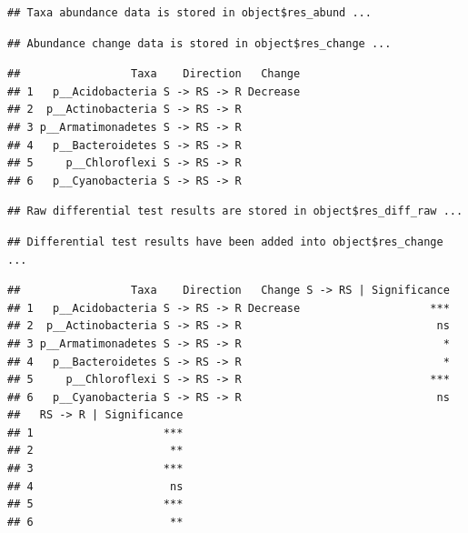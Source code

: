 \documentclass[
]{book}
\newenvironment{Shaded}{\begin{snugshade}}{\end{snugshade}}
\newcommand{\AttributeTok}[1]{\textcolor[rgb]{0.77,0.63,0.00}{#1}}
\newcommand{\CommentTok}[1]{\textcolor[rgb]{0.56,0.35,0.01}{\textit{#1}}}
\newcommand{\ConstantTok}[1]{\textcolor[rgb]{0.00,0.00,0.00}{#1}}
\newcommand{\FunctionTok}[1]{\textcolor[rgb]{0.00,0.00,0.00}{#1}}
\newcommand{\NormalTok}[1]{#1}
\newcommand{\SpecialCharTok}[1]{\textcolor[rgb]{0.00,0.00,0.00}{#1}}
\newcommand{\StringTok}[1]{\textcolor[rgb]{0.31,0.60,0.02}{#1}}
\begin{document}
\begin{verbatim}
## Taxa abundance data is stored in object$res_abund ...
\end{verbatim}

\begin{verbatim}
## Abundance change data is stored in object$res_change ...
\end{verbatim}

\begin{Shaded}
\end{Shaded}

\begin{verbatim}
##                 Taxa    Direction   Change
## 1   p__Acidobacteria S -> RS -> R Decrease
## 2  p__Actinobacteria S -> RS -> R         
## 3 p__Armatimonadetes S -> RS -> R         
## 4   p__Bacteroidetes S -> RS -> R         
## 5     p__Chloroflexi S -> RS -> R         
## 6   p__Cyanobacteria S -> RS -> R
\end{verbatim}

\begin{Shaded}
\end{Shaded}

\begin{verbatim}
## Raw differential test results are stored in object$res_diff_raw ...
\end{verbatim}

\begin{verbatim}
## Differential test results have been added into object$res_change ...
\end{verbatim}

\begin{Shaded}
\end{Shaded}

\begin{verbatim}
##                 Taxa    Direction   Change S -> RS | Significance
## 1   p__Acidobacteria S -> RS -> R Decrease                    ***
## 2  p__Actinobacteria S -> RS -> R                              ns
## 3 p__Armatimonadetes S -> RS -> R                               *
## 4   p__Bacteroidetes S -> RS -> R                               *
## 5     p__Chloroflexi S -> RS -> R                             ***
## 6   p__Cyanobacteria S -> RS -> R                              ns
##   RS -> R | Significance
## 1                    ***
## 2                     **
## 3                    ***
## 4                     ns
## 5                    ***
## 6                     **
\end{verbatim}
\end{document}
